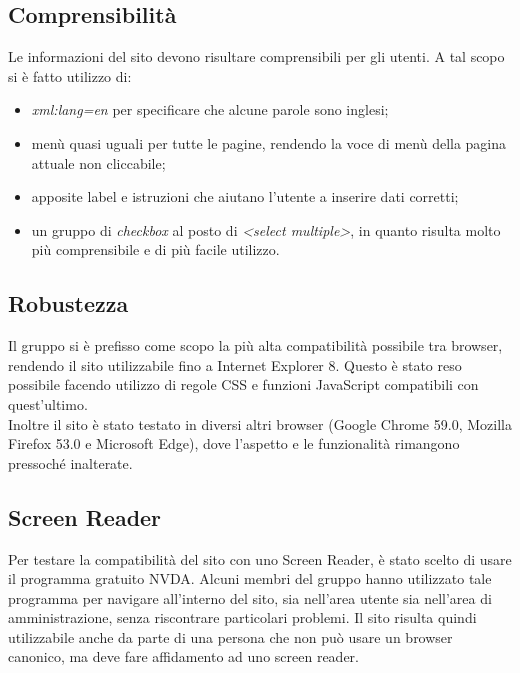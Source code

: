 \subsection{Comprensibilità}
Le informazioni del sito devono risultare comprensibili per gli utenti. A tal scopo si è fatto utilizzo di:
	\begin{itemize}
		\item \textit{xml:lang=en} per specificare che alcune parole sono inglesi;
		\item menù quasi uguali per tutte le pagine, rendendo la voce di menù della pagina attuale non cliccabile;
		\item apposite label e istruzioni che aiutano l'utente a inserire dati corretti;
		\item un gruppo di \textit{checkbox} al posto di \textit{<select multiple>}, in quanto risulta molto più comprensibile e di più facile utilizzo.
	\end{itemize}
\subsection{Robustezza}
Il gruppo si è prefisso come scopo la più alta compatibilità possibile tra browser, rendendo il sito utilizzabile fino a Internet Explorer 8. Questo è stato reso possibile facendo utilizzo di regole CSS e funzioni JavaScript compatibili
con quest'ultimo. \\
Inoltre il sito è stato testato in diversi altri browser (Google Chrome 59.0, Mozilla Firefox 53.0 e Microsoft Edge), dove l'aspetto e le funzionalità rimangono pressoché inalterate.

\subsection{Screen Reader}
Per testare la compatibilità del sito con uno Screen Reader, è stato scelto di usare il programma gratuito NVDA. Alcuni membri del gruppo hanno utilizzato tale programma per navigare all’interno del sito, sia nell’area utente sia nell’area di amministrazione, senza riscontrare particolari problemi. Il sito risulta quindi utilizzabile anche da parte di una persona che non può usare un browser canonico, ma deve fare affidamento ad uno screen reader.